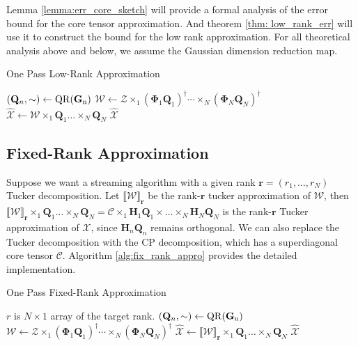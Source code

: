 Lemma \ref{lemma:err_core_sketch} will provide a formal analysis of the error bound for the core tensor approximation. And theorem \ref{thm: low_rank_err} will use it to construct the bound for the low rank approximation. For all theoretical analysis above and below, we assume the Gaussian dimension reduction map. 

\begin{algorithm}[ht]
\caption{One Pass Low-Rank Approximation}\label{alg:one_pass_low_rank_appro}
  \begin{algorithmic}[1]
  \State $(\mathbf{Q}_n, \sim) \leftarrow \rm{QR}(\mathbf{G}_n)$ 
  \EndFor 
  \State $\mathscr{W} \leftarrow \mathscr{Z}\times_1 (\mathbf{\Phi}_1\mathbf{Q}_1)^\dag \cdots \times_N (\mathbf{\Phi}_N\mathbf{Q}_N)^\dag $
  \State $\hat{\mathscr{X}} \leftarrow \mathscr{W} \times_1 \mathbf{Q}_1 \dots \times_N \mathbf{Q}_N$
  \State \Return $\hat{\mathscr{X}}$ 
  \EndFunction
\end{algorithmic}
\end{algorithm}

\subsection{Fixed-Rank Approximation}
Suppose we want a streaming algorithm with a given rank $\mathbf{r} = (r_1, \dots, r_N)$ Tucker decomposition. 
Let $\llbracket \mathscr{W} \rrbracket _{\mathbf{r}}$ be the rank-$\mathbf{r}$ tucker approximation of $\mathscr{W}$, then $ \llbracket \mathscr{W} \rrbracket _{\mathbf{r}} \times_1 \mathbf{Q}_1 \dots \times_N \mathbf{Q}_N = \mathscr{C} \times_1 \mathbf{H}_1\mathbf{Q}_1 \times \dots \times_N \mathbf{H}_N\mathbf{Q}_N$ is the rank-$\mathbf{r}$ Tucker approximation of $\mathscr{X}$, since $\mathbf{H}_n\mathbf{Q}_n$ remains orthogonal. We can also replace the Tucker decomposition with the CP decomposition, which has a superdiagonal core tensor $\mathscr{C}$. Algorithm \ref{alg:fix_rank_appro} provides the detailed implementation. 
\begin{algorithm}[ht]
\caption{One Pass Fixed-Rank Approximation}\label{alg:one_pass_fix_rank_appro}
  \begin{algorithmic}[1]
  \Require $r$ is $N\times 1$ array of the target rank.
  \State $(\mathbf{Q}_n, \sim) \leftarrow \rm{QR}(\mathbf{G}_n)$ 
  \EndFor 
  \State $\mathscr{W} \leftarrow \mathscr{Z}\times_1 (\mathbf{\Phi}_1\mathbf{Q}_1)^\dag \cdots \times_N (\mathbf{\Phi}_N\mathbf{Q}_N)^\dag $
  \State $\hat{\mathscr{X}} \leftarrow \llbracket \mathscr{W} \rrbracket _\mathbf{r} \times_1 \mathbf{Q}_1 \dots \times_N \mathbf{Q}_N$
  \State \Return $\hat{\mathscr{X}}$ 
  \EndFunction
\end{algorithmic}
\end{algorithm}
